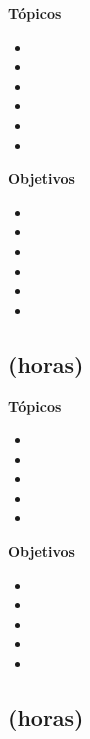 \textbf{Tópicos}
\begin{itemize}
	\item \PFUNOTopicSintaxis
	\item \PFUNOTopicVariables
	\item \PFUNOTopicEntrada
	\item \PFUNOTopicEstructuras
	\item \PFUNOTopicFunciones
	\item \PFUNOTopicDescomposicion
\end{itemize}

\textbf{Objetivos}
\begin{itemize}
	\item \PFUNOObjUNO
	\item \PFUNOObjDOS
	\item \PFUNOObjTRES
	\item \PFUNOObjCUATRO
	\item \PFUNOObjCINCO
	\item \PFUNOObjSEIS
\end{itemize}

\subsection{\PFDOSDef  (\PFDOSHours horas)}\label{sec:BOK-PF2}

\textbf{Tópicos}
\begin{itemize}
	\item \PFDOSTopicEstrategias
	\item \PFDOSTopicEl
	\item \PFDOSTopicEstrategiasde
	\item \PFDOSTopicEstrategiasdedepuracion
	\item \PFDOSTopicElConcepto
\end{itemize}

\textbf{Objetivos}
\begin{itemize}
	\item \PFDOSObjUNO
	\item \PFDOSObjDOS
	\item \PFDOSObjTRES
	\item \PFDOSObjCUATRO
	\item \PFDOSObjCINCO
\end{itemize}

\subsection{\PFTRESDef  (\PFTRESHours horas)}\label{sec:BOK-PF3}

